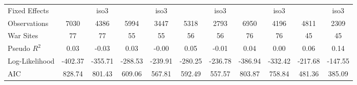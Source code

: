 \begin{tabular}{lcccccccccc}
Fixed Effects &  & iso3 &  & iso3 &  & iso3 &  & iso3 &  & iso3 \\
Observations & 7030 & 4386 & 5994 & 3447 & 5318 & 2793 & 6950 & 4196 & 4811 & 2309 \\
War Sites & 77 & 77 & 55 & 55 & 56 & 56 & 76 & 76 & 45 & 45 \\
Pseudo $R^2$ & 0.03 & -0.03 & 0.03 & -0.00 & 0.05 & -0.01 & 0.04 & 0.00 & 0.06 & 0.14 \\
Log-Likelihood & -402.37 & -355.71 & -288.53 & -239.91 & -280.25 & -236.78 & -386.94 & -332.42 & -217.68 & -147.55 \\
AIC & 828.74 & 801.43 & 609.06 & 567.81 & 592.49 & 557.57 & 803.87 & 758.84 & 481.36 & 385.09 \\
\bottomrule
\end{tabular}
